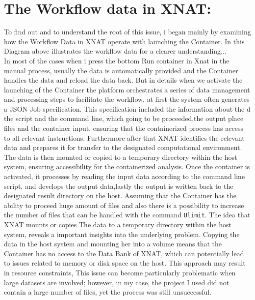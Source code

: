 \section{The Workflow data in XNAT:}
To find out and to understand the root of this issue, i began  mainly by examining how the Workflow Data in XNAT operate  with launching the Container.
In this Diagram above illustrates the workflow data for a clearer understanding...\\
In most of the cases when i press the bottom Run container in Xnat in the manual process, usually the data is automatically provided and the Container handles the data and reload the data back.
But in details when we activate the launching of the Container the platform orchestrates a series of data management and processing steps to facilitate the workflow. at first the system often generates a JSON Job specification. This specification included the information about the d the script and the command line, which going to be proceeded,the output place files and the container  input, ensuring that the containerized process has access to all relevant instructions. Furthermore after that XNAT identifies the relevant data and prepares it for transfer to the designated computational environment. The data is then mounted or copied to a temporary directory within the host system, ensuring accessibility for the containerized analysis. Once the container is activated, it processes by reading the input data according to the command line script, and develops the output data,lastly the  output is written back to the designated result directory on the host. 
Assuming  that the Container has the ability to proceed huge amount of files and also there is a possibility to increase the number of files that can be handled  with the command \texttt{Ulimit}. 
The idea that XNAT mounts or copies  The data to a temporary directory within the host system, reveals a important insights into the underlying problem. Copying the data in  the host system and mounting her into a volume means that the Container has no access to the Data Bank of XNAT, which can potentially lead to issues related to memory or disk space on the host. This approach may result in resource constraints, This issue can become particularly problematic when large datasets are involved; however, in my case, the project I used did not contain a large number of files, yet the process was still unsuccessful.

